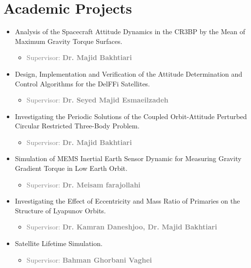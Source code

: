 \documentclass[10pt,a4paper,sans]{moderncv} %
\begin{document}
\section{Academic Projects}

\begin{itemize}

\item Analysis of the Spacecraft Attitude Dynamics in the CR3BP by the Mean of Maximum Gravity Torque Surfaces.
\begin{itemize}
	\item \textcolor{gray}{Supervisor: \textbf{Dr. Majid Bakhtiari } }
\end{itemize}

\item Design, Implementation and Verification of the Attitude Determination and Control Algorithms for the DelFFi Satellites.
\begin{itemize}
	\item \textcolor{gray}{Supervisor: \textbf{ Dr. Seyed Majid Esmaeilzadeh} }
\end{itemize}

\item Investigating the Periodic Solutions of the Coupled Orbit-Attitude Perturbed Circular Restricted Three-Body Problem. 
\begin{itemize}
	\item \textcolor{gray}{Supervisor: \textbf{Dr. Majid Bakhtiari} }
\end{itemize}


\item Simulation of MEMS Inertial Earth Sensor Dynamic for Measuring Gravity Gradient Torque in Low Earth Orbit.
\begin{itemize}
	\item \textcolor{gray}{Supervisor: \textbf{Dr. Meisam farajollahi} }
\end{itemize}


\item Investigating the Effect of Eccentricity and Mass Ratio of Primaries on the Structure of Lyapunov Orbits.
\begin{itemize}
	\item \textcolor{gray}{Supervisor: \textbf{Dr. Kamran Daneshjoo, Dr. Majid Bakhtiari}}
\end{itemize}

\item Satellite Lifetime Simulation.
\begin{itemize}
	\item \textcolor{gray}{Supervisor: \textbf{Bahman Ghorbani Vaghei} }
\end{itemize}

\end{itemize}
\end{document}
